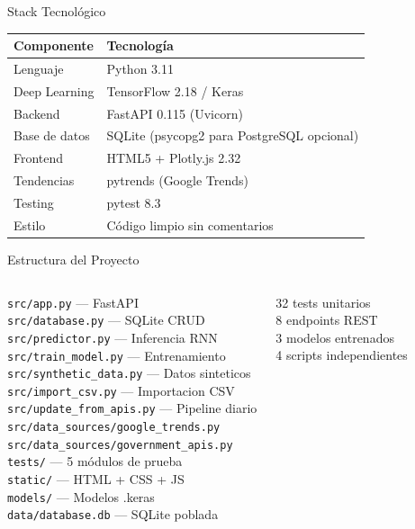 \documentclass[10pt]{beamer}
\begin{document}
\begin{frame}{Stack Tecnológico}
  \begin{table}
    \centering
    \begin{tabular}{ll}
      \toprule
      \textbf{Componente} & \textbf{Tecnología} \\
      \midrule
      Lenguaje & Python 3.11 \\
      Deep Learning & TensorFlow 2.18 / Keras \\
      Backend & FastAPI 0.115 (Uvicorn) \\
      Base de datos & SQLite (psycopg2 para PostgreSQL opcional) \\
      Frontend & HTML5 + Plotly.js 2.32 \\
      Tendencias & pytrends (Google Trends) \\
      Testing & pytest 8.3 \\
      Estilo & Código limpio sin comentarios \\
      \bottomrule
    \end{tabular}
  \end{table}
\end{frame}

\begin{frame}{Estructura del Proyecto}
  \begin{columns}[T]
    \texttt{src/app.py} --- FastAPI \\
    \texttt{src/database.py} --- SQLite CRUD \\
    \texttt{src/predictor.py} --- Inferencia RNN \\
    \texttt{src/train\_model.py} --- Entrenamiento \\
    \texttt{src/synthetic\_data.py} --- Datos sinteticos \\
    \texttt{src/import\_csv.py} --- Importacion CSV \\
    \texttt{src/update\_from\_apis.py} --- Pipeline diario \\
    \texttt{src/data\_sources/google\_trends.py} \\
    \texttt{src/data\_sources/government\_apis.py} \\
    \texttt{tests/} --- 5 módulos de prueba \\
    \texttt{static/} --- HTML + CSS + JS \\
    \texttt{models/} --- Modelos .keras \\
    \texttt{data/database.db} --- SQLite poblada
    
    32 tests unitarios \\
    \vspace{0.2cm}
    8 endpoints REST \\
    \vspace{0.2cm}
    3 modelos entrenados \\
    \vspace{0.2cm}
    4 scripts independientes
  \end{columns}
\end{frame}
\end{document}
